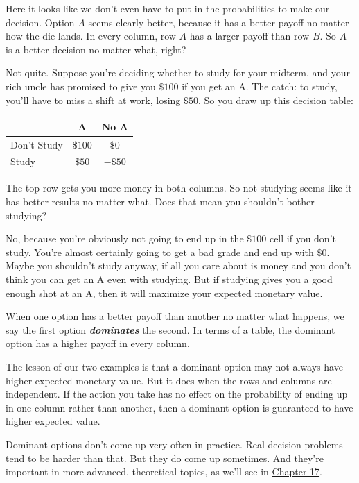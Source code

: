 \documentclass[justified]{tufte-book}
\theoremstyle{definition}
\theoremstyle{definition}
\theoremstyle{definition}
\theoremstyle{definition}
\theoremstyle{remark}
\begin{document}
Here it looks like we don't even have to put in the probabilities to make our decision. Option \(A\) seems clearly better, because it has a better payoff no matter how the die lands. In every column, row \(A\) has a larger payoff than row \(B\). So \(A\) is a better decision no matter what, right?

Not quite. Suppose you're deciding whether to study for your midterm, and your rich uncle has promised to give you \(\$100\) if you get an A. The catch: to study, you'll have to miss a shift at work, losing \(\$50\). So you draw up this decision table:

\begin{longtable}[]{@{}lcc@{}}
\toprule
& A & No A \\
\midrule
\endhead
Don't Study & \(\$100\) & \(\$0\) \\
Study & \(\$50\) & \(-\$50\) \\
\bottomrule
\end{longtable}

The top row gets you more money in both columns. So not studying seems like it has better results no matter what. Does that mean you shouldn't bother studying?

No, because you're obviously not going to end up in the \(\$100\) cell if you don't study. You're almost certainly going to get a bad grade and end up with \(\$0\). Maybe you shouldn't study anyway, if all you care about is money and you don't think you can get an A even with studying. But if studying gives you a good enough shot at an A, then it will maximize your expected monetary value.

When one option has a better payoff than another no matter what happens, we say the first option \textbf{\emph{dominates}} the second. In terms of a table, the dominant option has a higher payoff in every column.

The lesson of our two examples is that a dominant option may not always have higher expected monetary value. But it does when the rows and columns are independent. If the action you take has no effect on the probability of ending up in one column rather than another, then a dominant option is guaranteed to have higher expected value.

Dominant options don't come up very often in practice. Real decision problems tend to be harder than that. But they do come up sometimes. And they're important in more advanced, theoretical topics, as we'll see in \protect\hyperlink{dutch-books-1}{Chapter 17}.
\end{document}
